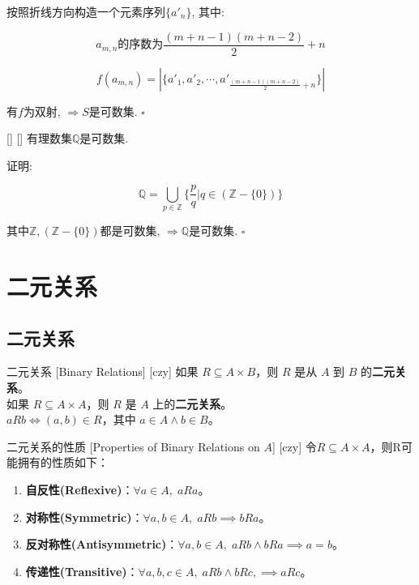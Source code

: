 \documentclass[UTF8]{ctexart}
\begin{document}
				按照折线方向构造一个元素序列$\{a'_n\}$, 其中: 
				
				\[a_{m,n}\mbox{的序数为}\frac{(m+n-1)(m+n-2)}{2}+n\]
				
				\[f(a_{m,n})=|\{a'_1,a'_2,\cdots,a'_{\frac{(m+n-1)(m+n-2)}{2}+n}\}|\]
				
				有$f$为双射, $\Longrightarrow S$是可数集. $\square$
				
			\begin{thm}
                []
                {}
                []
                []
				有理数集$\mathbb{Q}$是可数集. 
			\end{thm}
				
				证明: 
				
					\[\mathbb{Q}=\bigcup_{p\in\mathbb{Z}}\{\frac{p}{q}|q\in(\mathbb{Z}-\{0\})\}\]
					
					其中$\mathbb{Z}, (\mathbb{Z}-\{0\})$都是可数集, $\Longrightarrow\mathbb{Q}$是可数集. $\square$

    \section{二元关系}

    \subsection{二元关系}
        \begin{dfn}
            [UUID]
            {二元关系}
            [Binary Relations]
            [czy]
            如果 \( R \subseteq A \times B \)，则 \( R \) 是从 \( A \) 到 \( B \) 的\textbf{二元关系}。\\
            如果 \( R \subseteq A \times A \)，则 \( R \) 是 \( A \) 上的\textbf{二元关系}。\\
            \( a R b \iff (a, b) \in R \)，其中 \( a \in A \land b \in B \)。
        \end{dfn}

        \begin{dfn}
            [UUID]
            {二元关系的性质}
            [Properties of Binary Relations on \( A \)]
            [czy]
            令\( R \subseteq A \times A \)，则R可能拥有的性质如下：
            \begin{enumerate}
                \item \textbf{自反性(Reflexive)}：\( \forall a \in A, \; a R a \)。
                \item \textbf{对称性(Symmetric)}：\( \forall a, b \in A, \; a R b \implies b R a \)。
                \item \textbf{反对称性(Antisymmetric)}：\( \forall a, b \in A, \; a R b \land b R a \implies a = b \)。
                \item \textbf{传递性(Transitive)}：\( \forall a, b, c \in A, \;  a R b \land b R c, \implies a R c \)。
            \end{enumerate}
        \end{dfn}
\end{document}
